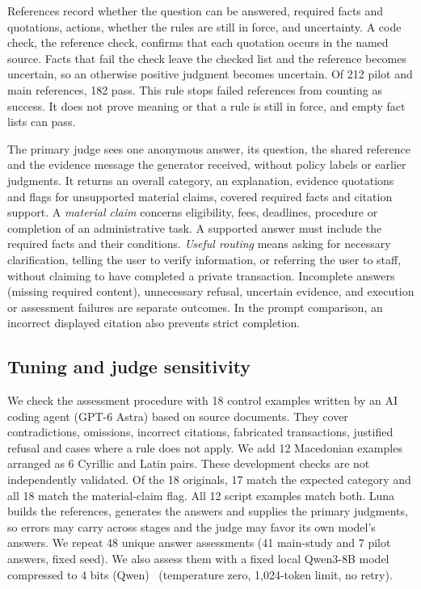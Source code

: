 \documentclass[a4paper,10pt,twocolumn]{article}
\begin{document}
References record whether the question can be answered, required facts and quotations, actions, whether the rules are still in force, and uncertainty. A code check, the reference check, confirms that each quotation occurs in the named source. Facts that fail the check leave the checked list and the reference becomes uncertain, so an otherwise positive judgment becomes uncertain. Of 212 pilot and main references, 182 pass. This rule stops failed references from counting as success. It does not prove meaning or that a rule is still in force, and empty fact lists can pass.

The primary judge sees one anonymous answer, its question, the shared reference and the evidence message the generator received, without policy labels or earlier judgments. It returns an overall category, an explanation, evidence quotations and flags for unsupported material claims, covered required facts and citation support. A \emph{material claim} concerns eligibility, fees, deadlines, procedure or completion of an administrative task. A supported answer must include the required facts and their conditions. \emph{Useful routing} means asking for necessary clarification, telling the user to verify information, or referring the user to staff, without claiming to have completed a private transaction. Incomplete answers (missing required content), unnecessary refusal, uncertain evidence, and execution or assessment failures are separate outcomes. In the prompt comparison, an incorrect displayed citation also prevents strict completion.

\subsection{Tuning and judge sensitivity}
We check the assessment procedure with 18 control examples written by an AI coding agent (GPT-6 Astra) based on source documents. They cover contradictions, omissions, incorrect citations, fabricated transactions, justified refusal and cases where a rule does not apply. We add 12 Macedonian examples arranged as 6 Cyrillic and Latin pairs. These development checks are not independently validated. Of the 18 originals, 17 match the expected category and all 18 match the material-claim flag. All 12 script examples match both.
Luna builds the references, generates the answers and supplies the primary judgments, so errors may carry across stages and the judge may favor its own model's answers. We repeat 48 unique answer assessments (41 main-study and 7 pilot answers, fixed seed). We also assess them with a fixed local Qwen3-8B model compressed to 4 bits (Qwen)~\cite{yang2025qwen3} (temperature zero, 1,024-token limit, no retry).
\end{document}
